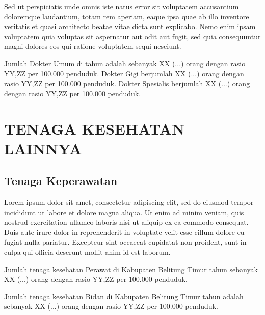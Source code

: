 Sed ut perspiciatis unde omnis iste natus error sit voluptatem accusantium doloremque laudantium, totam rem aperiam, eaque ipsa quae ab illo inventore veritatis et quasi architecto beatae vitae dicta sunt explicabo. Nemo enim ipsam voluptatem quia voluptas sit aspernatur aut odit aut fugit, sed quia consequuntur magni dolores eos qui ratione voluptatem sequi nesciunt.

Jumlah Dokter Umum di \namaKabupaten tahun \tP adalah
sebanyak XX (...) orang dengan rasio YY,ZZ per 100.000
penduduk. Dokter Gigi berjumlah XX (...) orang dengan rasio YY,ZZ per 100.000
penduduk. Dokter Spesialis berjumlah XX (...) orang dengan rasio YY,ZZ per 100.000
penduduk.

\section{TENAGA KESEHATAN LAINNYA}
\subsection{Tenaga Keperawatan}
Lorem ipsum dolor sit amet, consectetur adipiscing elit, sed do eiusmod tempor incididunt ut labore et dolore magna aliqua. Ut enim ad minim veniam, quis nostrud exercitation ullamco laboris nisi ut aliquip ex ea commodo consequat. Duis aute irure dolor in reprehenderit in voluptate velit esse cillum dolore eu fugiat nulla pariatur. Excepteur sint occaecat cupidatat non proident, sunt in culpa qui officia deserunt mollit anim id est laborum.

Jumlah tenaga kesehatan Perawat di Kabupaten Belitung Timur tahun
\tP sebanyak XX (...) orang dengan rasio YY,ZZ per 100.000
penduduk.

Jumlah tenaga kesehatan Bidan di Kabupaten Belitung Timur tahun \tP
adalah sebanyak XX (...) orang dengan rasio YY,ZZ per 100.000
penduduk.

